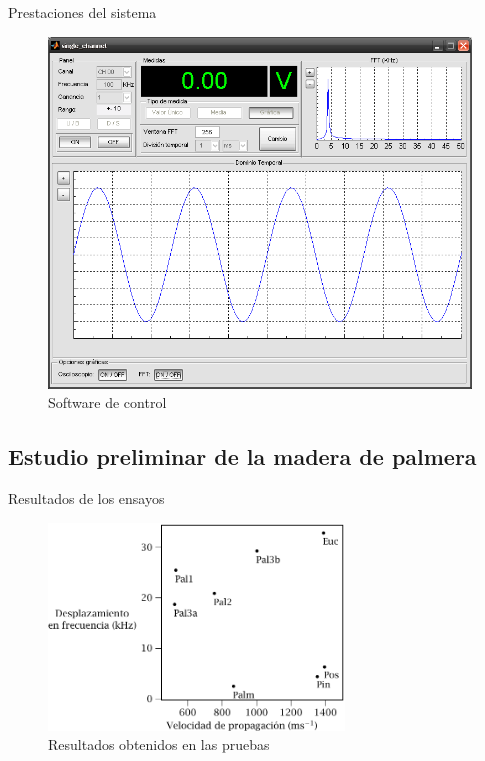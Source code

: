 \documentclass[utf8, compress]			{beamer}
\begin{document}
\begin{frame}{Prestaciones del sistema}
    \begin{figure}
	\includegraphics{software.png}
	\caption{Software de control}
	\label{fig:software}
    \end{figure}
\end{frame}


\subsection{Estudio preliminar de la madera de palmera}

\begin{frame}{Resultados de los ensayos}
    \begin{figure}
	\includegraphics[height=55mm, keepaspectratio]{resultados.pdf}
	\caption{Resultados obtenidos en las pruebas}
	\label{fig:results}
    \end{figure}
\end{frame}
\end{document}
